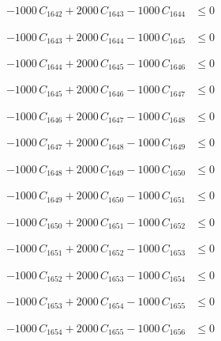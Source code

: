 \documentclass[a4paper,11pt]{article}
\begin{document}
\begin{align}
-1000\,C_{1642} + 2000\,C_{1643} - 1000\,C_{1644} &\leq 0 \nonumber
\end{align}

\begin{align}
-1000\,C_{1643} + 2000\,C_{1644} - 1000\,C_{1645} &\leq 0 \nonumber
\end{align}

\begin{align}
-1000\,C_{1644} + 2000\,C_{1645} - 1000\,C_{1646} &\leq 0 \nonumber
\end{align}

\begin{align}
-1000\,C_{1645} + 2000\,C_{1646} - 1000\,C_{1647} &\leq 0 \nonumber
\end{align}

\begin{align}
-1000\,C_{1646} + 2000\,C_{1647} - 1000\,C_{1648} &\leq 0 \nonumber
\end{align}

\begin{align}
-1000\,C_{1647} + 2000\,C_{1648} - 1000\,C_{1649} &\leq 0 \nonumber
\end{align}

\begin{align}
-1000\,C_{1648} + 2000\,C_{1649} - 1000\,C_{1650} &\leq 0 \nonumber
\end{align}

\begin{align}
-1000\,C_{1649} + 2000\,C_{1650} - 1000\,C_{1651} &\leq 0 \nonumber
\end{align}

\begin{align}
-1000\,C_{1650} + 2000\,C_{1651} - 1000\,C_{1652} &\leq 0 \nonumber
\end{align}

\begin{align}
-1000\,C_{1651} + 2000\,C_{1652} - 1000\,C_{1653} &\leq 0 \nonumber
\end{align}

\begin{align}
-1000\,C_{1652} + 2000\,C_{1653} - 1000\,C_{1654} &\leq 0 \nonumber
\end{align}

\begin{align}
-1000\,C_{1653} + 2000\,C_{1654} - 1000\,C_{1655} &\leq 0 \nonumber
\end{align}

\begin{align}
-1000\,C_{1654} + 2000\,C_{1655} - 1000\,C_{1656} &\leq 0 \nonumber
\end{align}
\end{document}
